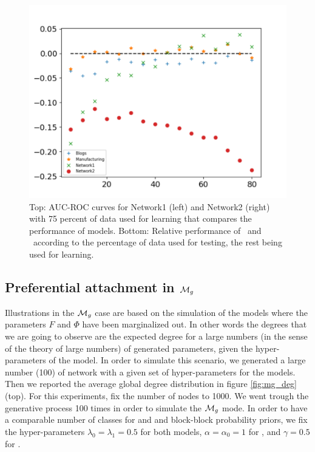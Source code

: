 \begin{figure}[ht]
\begin{minipage}{0.5\textwidth}
        \includegraphics[width=\textwidth]{img/corpus/testset_max_20}
    \end{minipage}
    \caption{Top: AUC-ROC curves for Network1 (left) and Network2 (right) with 75 percent of data used for learning that compares the performance of models. Bottom: Relative performance of \imb\ and \ifm\ according to the percentage of data used for testing, the rest being used for learning.} 
\label{fig:auc}
\end{figure}


\subsection{Preferential attachment in $\mathcal{M}_g$}

Illustrations in the $\mathcal{M}_g$ case are based on the simulation of the models where the parameters $F$ and $\Phi$ have been marginalized out. In other words the degrees that we are going to observe are the expected degree for a large numbers (in the sense of the theory of large numbers) of generated parameters, given the hyper-parameters of the model. In order to simulate this scenario, we generated a large number (100) of network with a given set of hyper-parameters for the models. Then we reported the average global degree distribution in figure \ref{fig:mg_deg} (top).  For  this  experiments, fix the number of nodes to 1000. We went trough the generative process 100 times in order to simulate the $\mathcal{M}_g$ mode. In order to have a comparable number of classes for \ifm and \imb and block-block probability priors, we fix the hyper-parameters  $\lambda_0=\lambda_1=0.5$ for both models,  $\alpha=\alpha_0=1$ for \ifm, and  $\gamma=0.5$ for \imb.

